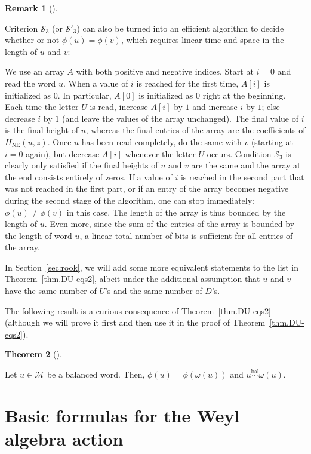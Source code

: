 \documentclass[numbers=enddot,12pt,final,onecolumn,notitlepage]{scrartcl}%
\theoremstyle{definition}
\newtheorem{theo}{Theorem}[section]
\newenvironment{theorem}[1][]
{\begin{theo}[#1]\begin{leftbar}}
{\end{leftbar}\end{theo}}
\newtheorem{remk}[theo]{Remark}
\newenvironment{remark}[1][]
{\begin{remk}[#1]\begin{leftbar}}
{\end{leftbar}\end{remk}}
\newcommand{\M}{\mathcal{M}}
\newcommand{\NE}{\operatorname{NE}}
\newcommand{\balsim}{\overset{\operatorname*{bal}}{\sim}}
\newcommand{\tup}[1]{\left( #1 \right)}
\begin{document}
\begin{remark}
\label{rmk.algorithm}
Criterion $\mathcal{S}_3$ (or $\mathcal{S}'_3$) can also be turned into an efficient algorithm to decide whether or not $\phi\tup{u} = \phi\tup{v}$, which requires linear time and space in the length of $u$ and $v$: 

We use an array $A$ with both positive and negative indices. 
Start at $i=0$ and read the word $u$. When a value of $i$ is reached for the first time, $A[i]$ is initialized as $0$. In particular, $A[0]$ is initialized as $0$ right at the beginning. 
Each time the letter $U$ is read, increase $A[i]$ by $1$ and increase $i$ by $1$; else decrease $i$ by $1$ (and leave the values of the array unchanged). The final value of $i$ is the final height of $u$, whereas the final entries of the array are the coefficients of $H_{\NE}\tup{u, z}$. 
Once $u$ has been read completely, do the same with $v$ (starting at $i=0$ again), but decrease $A[i]$ whenever the letter $U$ occurs. Condition $\mathcal{S}_3$ is clearly only satisfied if the final heights of $u$ and $v$ are the same and the array at the end consists entirely of zeros. If a value of $i$ is reached in the second part that was not reached in the first part, or if an entry of the array becomes negative during the second stage of the algorithm, one can stop immediately: $\phi\tup{u} \neq \phi\tup{v}$ in this case.
The length of the array is thus bounded by the length of $u$. Even more, since the sum of the entries of the array is bounded by the length of word $u$, a linear total number of bits is sufficient for all entries of the array.
\end{remark}

In Section~\ref{sec:rook}, we will add some more equivalent statements to the list in Theorem~\ref{thm.DU-eqs2}, albeit under the additional assumption that $u$ and $v$ have the same number of $U$'s and the same number of $D$'s.

The following result is a curious consequence of Theorem~\ref{thm.DU-eqs2} (although we will prove it first and then use it in the proof of Theorem~\ref{thm.DU-eqs2}).

\begin{theorem}
\label{thm.phiomega}
Let $u \in \M$ be a balanced word. Then,
$\phi\tup{u} = \phi\tup{\omega\tup{u}}$ and
$u \balsim \omega\tup{u}$.
\end{theorem}

\section{Basic formulas for the Weyl algebra action}\label{sec:basicform}
\end{document}
